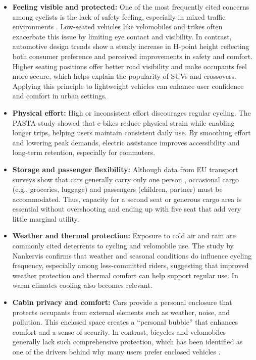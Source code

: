 \begin{itemize}
    \item \textbf{Feeling visible and protected:}
    One of the most frequently cited concerns among cyclists is the lack of safety feeling, especially in mixed traffic environments \cite{marincek_comparing_2023}. Low-seated vehicles like velomobiles and trikes often exacerbate this issue by limiting eye contact and visibility. In contrast, automotive design trends show a steady increase in H-point height reflecting both consumer preference and perceived improvements in safety and comfort\cite{noauthor_riding_2008}. Higher seating positions offer better road visibility and make occupants feel more secure, which helps explain the popularity of SUVs and crossovers. Applying this principle to lightweight vehicles can enhance user confidence and comfort in urban settings.

    \item \textbf{Physical effort:}
    High or inconsistent effort discourages regular cycling. The PASTA study \cite{castro_physical_2019} showed that e-bikes reduce physical strain while enabling longer trips, helping users maintain consistent daily use. By smoothing effort and lowering peak demands, electric assistance improves accessibility and long-term retention, especially for commuters.

    \item \textbf{Storage and passenger flexibility:} Although data from EU transport surveys show that cars generally carry only one person \cite{ceu_move_study_2022}, occasional cargo (e.g., groceries, luggage) and passengers (children, partner) must be accommodated. Thus, capacity for a second seat or generous cargo area is essential without overshooting and ending up with five seat that add very little marginal utility.

    \item \textbf{Weather and thermal protection:} 
    Exposure to cold air and rain are commonly cited deterrents to cycling and velomobile use. The study by Nankervis \cite{nankervis_effect_1999} confirms that weather and seasonal conditions do influence cycling frequency, especially among less-committed riders, suggesting that improved weather protection and thermal comfort can help support regular use. In warm climates cooling also becomes relevant.
    
    \item \textbf{Cabin privacy and comfort:} 
    Cars provide a personal enclosure that protects occupants from external elements such as weather, noise, and pollution. This enclosed space creates a “personal bubble” that enhances comfort and a sense of security. In contrast, bicycles and velomobiles generally lack such comprehensive protection, which has been identified as one of the drivers behind why many users prefer enclosed vehicles \cite{noauthor_freedom_nodate}.


\end{itemize}
